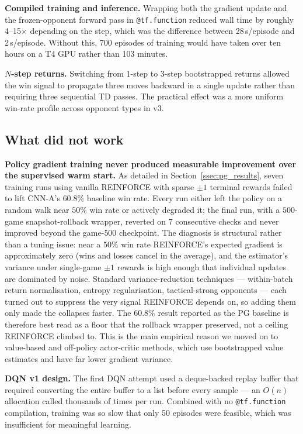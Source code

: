 \documentclass[11pt]{article}
\begin{document}
\textbf{Compiled training and inference.} Wrapping both the gradient
update and the frozen-opponent forward pass in \texttt{@tf.function}
reduced wall time by roughly 4--15$\times$ depending on the step,
which was the difference between 28\,s/episode and 2\,s/episode.
Without this, 700 episodes of training would have taken over ten hours
on a T4 GPU rather than 103 minutes.

\textbf{$N$-step returns.} Switching from 1-step to 3-step bootstrapped
returns allowed the win signal to propagate three moves backward in a
single update rather than requiring three sequential TD passes.
The practical effect was a more uniform win-rate profile across
opponent types in v3.

\subsection{What did not work}

\textbf{Policy gradient training never produced measurable
improvement over the supervised warm start.} As detailed in
Section~\ref{ssec:pg_results}, seven training runs using vanilla
REINFORCE with sparse $\pm 1$ terminal rewards failed to lift CNN-A's
$60.8\%$ baseline win rate. Every run either left the policy on a
random walk near $50\%$ win rate or actively degraded it; the final
run, with a $500$-game snapshot-rollback wrapper, reverted on $7$
consecutive checks and never improved beyond the game-$500$
checkpoint. The diagnosis is structural rather than a tuning issue:
near a $50\%$ win rate REINFORCE's expected gradient is approximately
zero (wins and losses cancel in the average), and the estimator's
variance under single-game $\pm 1$ rewards is high enough that
individual updates are dominated by noise. Standard
variance-reduction techniques --- within-batch return normalisation,
entropy regularisation, tactical-strong opponents --- each turned out
to suppress the very signal REINFORCE depends on, so adding them only
made the collapses faster. The $60.8\%$ result reported as the PG
baseline is therefore best read as a floor that the rollback wrapper
preserved, not a ceiling REINFORCE climbed to. This is the main
empirical reason we moved on to value-based and off-policy
actor-critic methods, which use bootstrapped value estimates and
have far lower gradient variance.

\textbf{DQN v1 design.} The first DQN attempt used a deque-backed
replay buffer that required converting the entire buffer to a list
before every sample --- an $O(n)$ allocation called thousands of
times per run. Combined with no \texttt{@tf.function} compilation,
training was so slow that only 50 episodes were feasible, which was
insufficient for meaningful learning.
\end{document}
